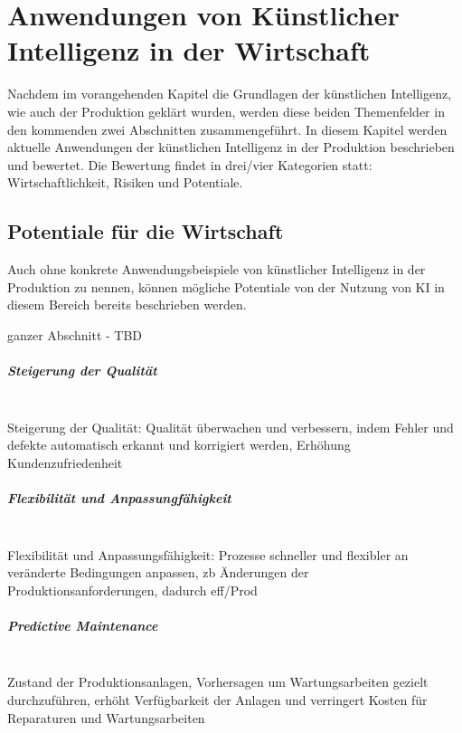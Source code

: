\documentclass[a4paper,12pt, german]{report}
\begin{document}



\chapter{Anwendungen von Künstlicher Intelligenz in der Wirtschaft}

Nachdem im vorangehenden Kapitel die Grundlagen der künstlichen Intelligenz, wie auch der Produktion geklärt wurden, werden diese beiden Themenfelder in den kommenden zwei Abschnitten zusammengeführt. In diesem Kapitel werden aktuelle Anwendungen der künstlichen Intelligenz in der Produktion beschrieben und bewertet. Die Bewertung findet in drei/vier Kategorien statt: Wirtschaftlichkeit, Risiken und Potentiale.

\section{Potentiale für die Wirtschaft}
Auch ohne konkrete Anwendungsbeispiele von künstlicher Intelligenz in der Produktion zu nennen, können mögliche Potentiale von der Nutzung von KI in diesem Bereich bereits beschrieben werden.

ganzer Abschnitt - TBD 

\paragraph{Steigerung der Qualität} $ $ \\ 
Steigerung der Qualität: Qualität überwachen und verbessern, indem Fehler und defekte automatisch erkannt und korrigiert werden, Erhöhung Kundenzufriedenheit

\paragraph{Flexibilität und Anpassungfähigkeit} $ $ \\ 
Flexibilität und Anpassungsfähigkeit: Prozesse schneller und flexibler an veränderte Bedingungen anpassen, zb Änderungen der Produktionsanforderungen, dadurch eff/Prod

\paragraph{Predictive Maintenance} $ $ \\ 
Zustand der Produktionsanlagen, Vorhersagen um Wartungsarbeiten gezielt durchzuführen, erhöht Verfügbarkeit der Anlagen und verringert Kosten für Reparaturen und Wartungsarbeiten
\end{document}
